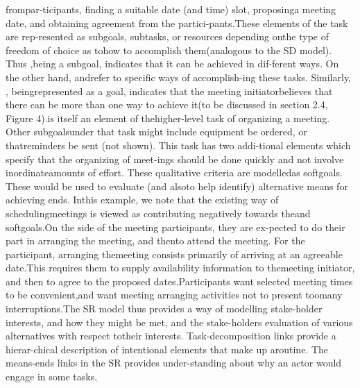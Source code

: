 frompar-ticipants, ﬁnding a suitable date (and time) slot, proposinga meeting date, and obtaining agreement from the partici-pants.These elements of the task are rep-resented as subgoals, subtasks, or resources depending onthe type of freedom of choice as tohow to accomplish them(analogous to the SD model). Thus ,being a subgoal, indicates that it can be achieved in dif-ferent ways. On the other hand, andrefer to speciﬁc ways of accomplish-ing these tasks. Similarly, , beingrepresented as a goal, indicates that the meeting initiatorbelieves that there can be more than one way to achieve it(to be discussed in section 2.4, Figure 4).is itself an element of thehigher-level task of organizing a meeting. Other subgoalsunder that task might include equipment be ordered, or thatreminders be sent (not shown). This task has two addi-tional elements which specify that the organizing of meet-ings should be done quickly and not involve inordinateamounts of effort. These qualitative criteria are modelledas softgoals. These would be used to evaluate (and alsoto help identify) alternative means for achieving ends. Inthis example, we note that the existing way of schedulingmeetings is viewed as contributing negatively towards theand softgoals.On the side of the meeting participants, they are ex-pected to do their part in arranging the meeting, and thento attend the meeting. For the participant, arranging themeeting consists primarily of arriving at an agreeable date.This requires them to supply availability information to themeeting initiator, and then to agree to the proposed dates.Participants want selected meeting times to be convenient,and want meeting arranging activities not to present toomany interruptions.The SR model thus provides a way of modelling stake-holder interests, and how they might be met, and the stake-holders evaluation of various alternatives with respect totheir interests. Task-decomposition links provide a hierar-chical description of intentional elements that make up aroutine. The means-ends links in the SR provides under-standing about why an actor would engage in some tasks,
